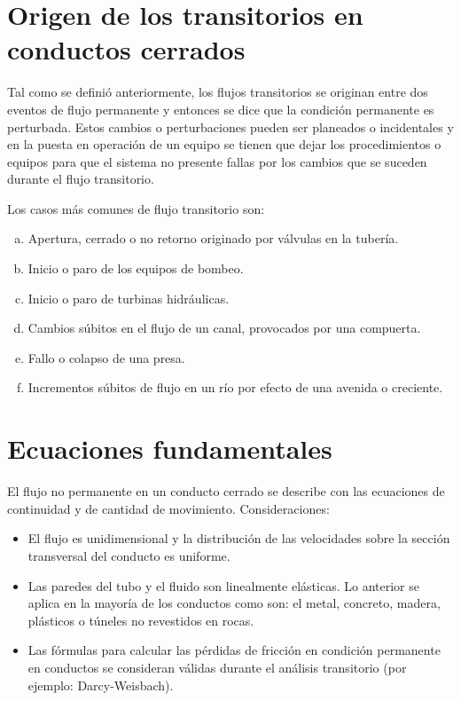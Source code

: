\documentclass[letterpaper]{report}
\begin{document}
\section{Origen de los transitorios en conductos cerrados}
Tal como se definió anteriormente, los flujos transitorios se originan entre dos eventos de flujo permanente y entonces se dice que la condición permanente es perturbada. Estos cambios o 
perturbaciones pueden ser planeados o incidentales y en la puesta en operación de un equipo se tienen que dejar los procedimientos o equipos para que el sistema no presente fallas por los 
cambios que se suceden durante el flujo transitorio.\bigskip

Los casos más comunes de flujo transitorio son:
\begin{enumerate}[a.]
	\item Apertura, cerrado o no retorno originado por válvulas en la tubería.
	\item Inicio o paro de los equipos de bombeo.
	\item Inicio o paro de turbinas hidráulicas.
	\item Cambios súbitos en el flujo de un canal, provocados por una compuerta.
	\item Fallo o colapso de una presa.
	\item Incrementos súbitos de flujo en un río por efecto de una avenida o creciente.
\end{enumerate}

\section{Ecuaciones fundamentales}
El flujo no permanente en un conducto cerrado se describe con las ecuaciones de continuidad y de cantidad de movimiento.
Consideraciones:
\begin{itemize}
	\item El flujo es unidimensional y la distribución de las velocidades sobre la sección transversal del conducto es uniforme.
	\item Las paredes del tubo y el fluido son linealmente elásticas. Lo anterior se aplica en la mayoría de los conductos como son: el metal, concreto, madera, plásticos o túneles 
	no revestidos en rocas.
	\item Las fórmulas para calcular las pérdidas de fricción en condición permanente en conductos se consideran válidas durante el análisis transitorio (por ejemplo: Darcy-Weisbach).
\end{itemize}
	 
\end{document}
